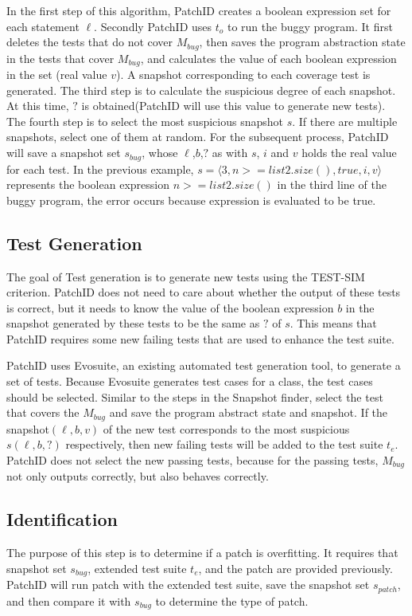\documentclass[sn-basic]{sn-jnl}
\theoremstyle{thmstyleone}
\theoremstyle{thmstyletwo}
\theoremstyle{thmstylethree}
\begin{document}
In the first step of this algorithm, PatchID creates a boolean expression set for each statement $\ell$. Secondly PatchID uses $t_o$ to run the buggy program. It first deletes the tests that do not cover $M_{bug}$, then saves the program abstraction state in the tests that cover $M_{bug}$, and calculates the value of each boolean expression in the set (real value $v$). A snapshot corresponding to each coverage test is generated. The third step is to calculate the suspicious degree of each snapshot. At this time, $?$ is obtained(PatchID will use this value to generate new tests). The fourth step is to select the most suspicious snapshot $s$. If there are multiple snapshots, select one of them at random. For the subsequent process, PatchID will save a snapshot set $s_{bug}$, whose $\ell$,$b$,$?$ as with $s$, $i$ and $v$ holds the real value for each test. In the previous example, $s= \langle 3,n>=list2.size(),true,i,v \rangle$ represents the boolean expression $n>=list2.size()$ in the third line of the buggy program, the error occurs because expression is evaluated to be true.

\subsection{Test Generation}
The goal of Test generation is to generate new tests using the TEST-SIM criterion. PatchID does not need to care about whether the output of these tests is correct, but it needs to know the value of the boolean expression $b$ in the snapshot generated by these tests to be the same as $?$ of $s$. This means that PatchID requires some new failing tests that are used to enhance the test suite.

PatchID uses Evosuite\citep{bib70}, an existing automated test generation tool, to generate a set of tests. Because Evosuite generates test cases for a class, the test cases should be selected. Similar to the steps in the Snapshot finder, select the test that covers the $M_{bug}$ and save the program abstract state and snapshot. If the snapshot$(\ell,b,v)$ of the new test corresponds to the most suspicious $s(\ell,b,?)$ respectively, then new failing tests will be added to the test suite $t_e$. PatchID does not select the new passing tests, because for the passing tests, $M_{bug}$ not only outputs correctly, but also behaves correctly.

\subsection{Identification}
The purpose of this step is to determine if a patch is overfitting. It requires that snapshot set $s_{bug}$, extended test suite $t_e$, and the patch are provided previously. PatchID will run patch with the extended test suite, save the snapshot set $s_{patch}$, and then compare it with $s_{bug}$ to determine the type of patch.
\end{document}
